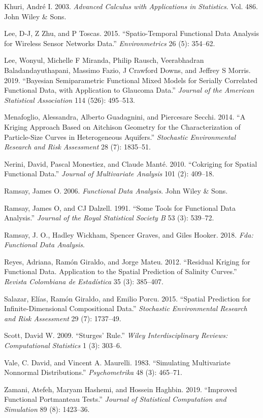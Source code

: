 \documentclass[
  12pt,
]{article}
\theoremstyle{definition}
\theoremstyle{definition}
\theoremstyle{definition}
\theoremstyle{remark}
\begin{document}
\leavevmode\hypertarget{ref-khuri2003advanced}{}%
Khuri, André I. 2003. \emph{Advanced Calculus with Applications in Statistics}. Vol. 486. John Wiley \& Sons.

\leavevmode\hypertarget{ref-lee2015spatio}{}%
Lee, D-J, Z Zhu, and P Toscas. 2015. ``Spatio-Temporal Functional Data Analysis for Wireless Sensor Networks Data.'' \emph{Environmetrics} 26 (5): 354--62.

\leavevmode\hypertarget{ref-lee2019bayesian}{}%
Lee, Wonyul, Michelle F Miranda, Philip Rausch, Veerabhadran Baladandayuthapani, Massimo Fazio, J Crawford Downs, and Jeffrey S Morris. 2019. ``Bayesian Semiparametric Functional Mixed Models for Serially Correlated Functional Data, with Application to Glaucoma Data.'' \emph{Journal of the American Statistical Association} 114 (526): 495--513.

\leavevmode\hypertarget{ref-menafoglio2014kriging}{}%
Menafoglio, Alessandra, Alberto Guadagnini, and Piercesare Secchi. 2014. ``A Kriging Approach Based on Aitchison Geometry for the Characterization of Particle-Size Curves in Heterogeneous Aquifers.'' \emph{Stochastic Environmental Research and Risk Assessment} 28 (7): 1835--51.

\leavevmode\hypertarget{ref-nerini2010cokriging}{}%
Nerini, David, Pascal Monestiez, and Claude Manté. 2010. ``Cokriging for Spatial Functional Data.'' \emph{Journal of Multivariate Analysis} 101 (2): 409--18.

\leavevmode\hypertarget{ref-ramsay2006functional}{}%
Ramsay, James O. 2006. \emph{Functional Data Analysis}. John Wiley \& Sons.

\leavevmode\hypertarget{ref-ramsay1991some}{}%
Ramsay, James O, and CJ Dalzell. 1991. ``Some Tools for Functional Data Analysis.'' \emph{Journal of the Royal Statistical Society B} 53 (3): 539--72.

\leavevmode\hypertarget{ref-ramsay2018}{}%
Ramsay, J. O., Hadley Wickham, Spencer Graves, and Giles Hooker. 2018. \emph{Fda: Functional Data Analysis}.

\leavevmode\hypertarget{ref-reyesresidual}{}%
Reyes, Adriana, Ramón Giraldo, and Jorge Mateu. 2012. ``Residual Kriging for Functional Data. Application to the Spatial Prediction of Salinity Curves.'' \emph{Revista Colombiana de Estadística} 35 (3): 385--407.

\leavevmode\hypertarget{ref-salazar2015spatial}{}%
Salazar, Elías, Ramón Giraldo, and Emilio Porcu. 2015. ``Spatial Prediction for Infinite-Dimensional Compositional Data.'' \emph{Stochastic Environmental Research and Risk Assessment} 29 (7): 1737--49.

\leavevmode\hypertarget{ref-scott2009sturges}{}%
Scott, David W. 2009. ``Sturges' Rule.'' \emph{Wiley Interdisciplinary Reviews: Computational Statistics} 1 (3): 303--6.

\leavevmode\hypertarget{ref-Vale1983}{}%
Vale, C. David, and Vincent A. Maurelli. 1983. ``Simulating Multivariate Nonnormal Distributions.'' \emph{Psychometrika} 48 (3): 465--71.

\leavevmode\hypertarget{ref-zamani2019improved}{}%
Zamani, Atefeh, Maryam Hashemi, and Hossein Haghbin. 2019. ``Improved Functional Portmanteau Tests.'' \emph{Journal of Statistical Computation and Simulation} 89 (8): 1423--36.
\end{document}
